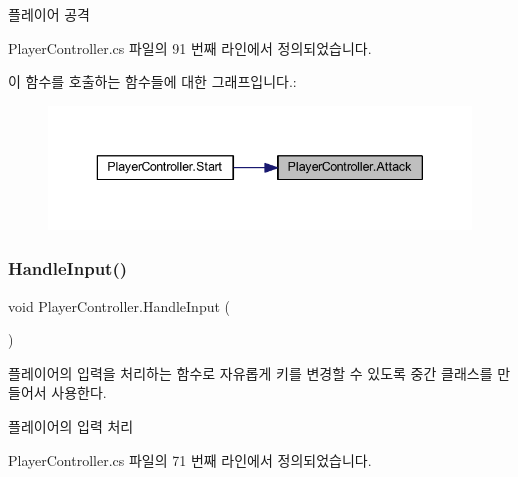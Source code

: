 플레이어 공격 



Player\+Controller.\+cs 파일의 91 번째 라인에서 정의되었습니다.


\begin{DoxyCode}{0}

\end{DoxyCode}
이 함수를 호출하는 함수들에 대한 그래프입니다.\+:
\nopagebreak
\begin{figure}[H]
\begin{center}
\leavevmode
\includegraphics[width=343pt]{dc/dde/class_player_controller_a473a610cfe2a374d5cb39b3c44881d11_icgraph}
\end{center}
\end{figure}
\mbox{\label{class_player_controller_a5ebfe098b2dc258ca8349e6951766883}} 
\subsubsection{\texorpdfstring{HandleInput()}{HandleInput()}}
{\footnotesize\ttfamily void Player\+Controller.\+Handle\+Input (\begin{DoxyParamCaption}{ }\end{DoxyParamCaption})\hspace{0.3cm}{\ttfamily [inline]}}



플레이어의 입력을 처리하는 함수로 자유롭게 키를 변경할 수 있도록 중간 클래스를 만들어서 사용한다. 

플레이어의 입력 처리 

Player\+Controller.\+cs 파일의 71 번째 라인에서 정의되었습니다.


